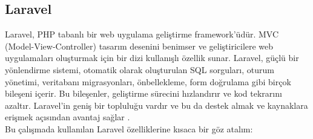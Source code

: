 \subsection{Laravel}
Laravel, PHP tabanlı bir web uygulama geliştirme framework'üdür. MVC (Model-View-Controller) tasarım desenini benimser ve geliştiricilere web uygulamaları oluşturmak için bir dizi kullanışlı özellik sunar. Laravel, güçlü bir yönlendirme sistemi, otomatik olarak oluşturulan SQL sorguları, oturum yönetimi, veritabanı migrasyonları, önbellekleme, form doğrulama gibi birçok bileşeni içerir. Bu bileşenler, geliştirme sürecini hızlandırır ve kod tekrarını azaltır. Laravel'in geniş bir topluluğu vardır ve bu da destek almak ve kaynaklara erişmek açısından avantaj sağlar \cite{laravel_documentation}.\\
Bu çalışmada kullanılan Laravel özelliklerine kısaca bir göz atalım:
